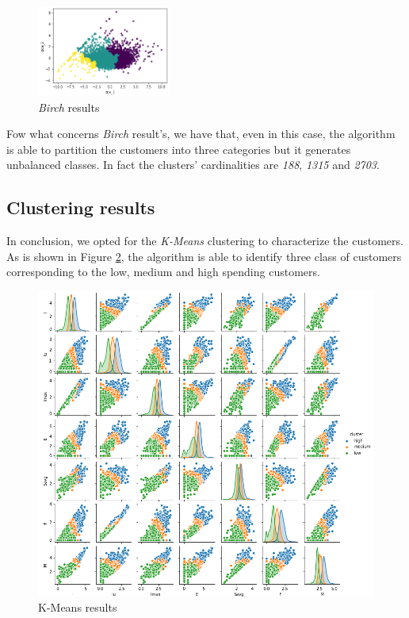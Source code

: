 \begin{figure}
	\vspace*{-1cm}
	\begin{center}
		\includegraphics[width=0.39\textwidth]{img/clustering/clust_birch.png}
	\end{center}
	\caption{\emph{Birch} results}
	\label{fig:clust_birch}
\end{figure}

Fow what concerns \emph{Birch} result's, we have that, even in this case, the algorithm is able to partition the customers into three categories but it generates unbalanced classes. In fact the clusters' cardinalities are \emph{188}, \emph{1315} and \emph{2703}.

\newpage

\subsection{Clustering results}

In conclusion, we opted for the \emph{K-Means} clustering to characterize the customers. As is shown in Figure \ref{fig:pairplot}, the algorithm is able to identify three class of customers corresponding to the low, medium and high spending customers.

\begin{figure}[h!]
	\captionsetup{justification=centering}
	\centering
	\includegraphics[width=\textwidth]{img/clustering/pair_plot_clust.png}
	\centering
	\caption{K-Means results}
	\label{fig:pairplot}
\end{figure}


